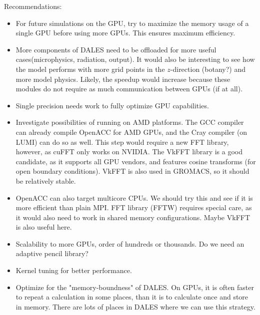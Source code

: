 Recommendations:
\begin{itemize}
    \item For future simulations on the GPU, try to maximize the memory usage of a single GPU before using more GPUs. This ensures maximum efficiency.
    \item More components of DALES need to be offloaded for more useful cases(microphysics, radiation, output). It would also be interesting to see how the model performs with more grid points in the $z$-direction (botany?) and more model physics. Likely, the speedup would increase because these modules do not require as much communication between GPUs (if at all).
    \item Single precision needs work to fully optimize GPU capabilities. 
    \item Investigate possibilities of running on AMD platforms. The GCC compiler can already compile OpenACC for AMD GPUs, and the Cray compiler (on LUMI) can do so as well. This step would require a new FFT library, however, as cuFFT only works on NVIDIA. The VkFFT library is a good candidate, as it supports all GPU vendors, and features cosine transforms (for open boundary conditions). VkFFT is also used in GROMACS, so it should be relatively stable.
    \item OpenACC can also target multicore CPUs. We should try this and see if it is more efficient than plain MPI. FFT library (FFTW) requires special care, as it would also need to work in shared memory configurations. Maybe VkFFT is also useful here.
    \item Scalability to more GPUs, order of hundreds or thousands. Do we need an adaptive pencil library? 
    \item Kernel tuning for better performance. 
    \item Optimize for the "memory-boundness" of DALES. On GPUs, it is often faster to repeat a calculation in some places, than it is to calculate once and store in memory. There are lots of places in DALES where we can use this strategy.
\end{itemize}